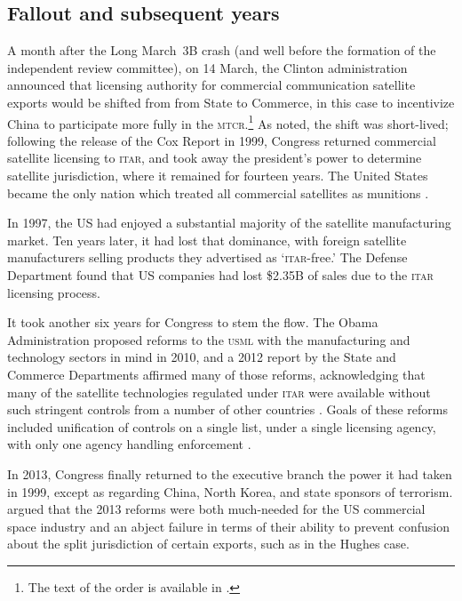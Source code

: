\documentclass[12pt]{olfmemo}
\begin{document}
\subsection{Fallout and subsequent years}
A month after the Long March~3B crash (and well before the formation of the independent review committee), on 14 March, the Clinton administration announced that licensing authority for commercial communication satellite exports would be shifted from from State to Commerce, in this case to incentivize China to participate more fully in the \textsc{mtcr}.\footnote{The text of the order is available in \citet{State61FR56894_1996}.} As \citet{Zinger2015} noted, the shift was short-lived; following the release of the Cox Report in 1999, Congress returned commercial satellite licensing to \textsc{itar}, and took away the president's power to determine satellite jurisdiction, where it remained for fourteen years. The United States became the only nation which treated all commercial satellites as munitions \citep{Section1248}.

In 1997, the US had enjoyed a substantial majority of the satellite manufacturing market. Ten years later, it had lost that dominance, with foreign satellite manufacturers selling products they advertised as `\textsc{itar}-free.' The Defense Department found that US companies had lost \$2.35B of sales due to the \textsc{itar} licensing process. \citep{AFRL2007}

It took another six years for Congress to stem the flow. The Obama Administration proposed reforms to the \textsc{usml} with the manufacturing and technology sectors in mind in 2010, and a 2012 report by the State and Commerce Departments affirmed many of those reforms, acknowledging that many of the satellite technologies regulated under \textsc{itar} were available without such stringent controls from a number of other countries \citep{Section1248}. Goals of these reforms included unification of controls on a single list, under a single licensing agency, with only one agency handling enforcement \citep{Fergusson2020}.

In 2013, Congress finally returned to the executive branch the power it had taken in 1999, except as regarding China, North Korea, and state sponsors of terrorism. \citet{Zinger2015} argued that the 2013 reforms were both much-needed for the US commercial space industry and an abject failure in terms of their ability to prevent confusion about the split jurisdiction of certain exports, such as in the Hughes case.
\end{document}
